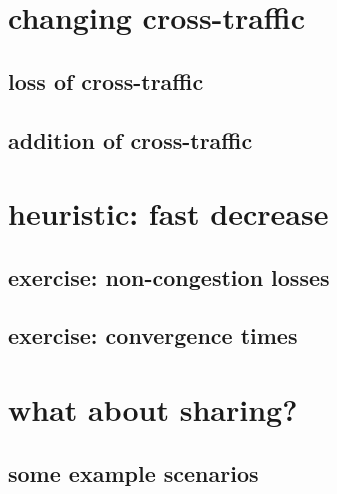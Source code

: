 \section{changing cross-traffic}

\subsection{loss of cross-traffic}

\subsection{addition of cross-traffic}

\section{heuristic: fast decrease}


\subsection{exercise: non-congestion losses}

\subsection{exercise: convergence times}

\section{what about sharing?}

\subsection{some example scenarios}

    




